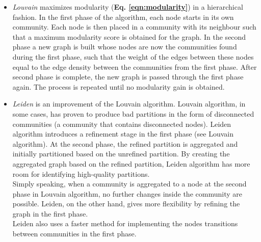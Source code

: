 \begin{itemize}
\item \textit{Louvain}\cite{Blondel_2008} maximizes modularity (\textbf{Eq. \eqref{eqn:modularity}}) in a hierarchical fashion. In the first phase of the algorithm, each node starts in its own community. Each node is then placed in a community with its neighbour such that a maximum modularity score is obtained for the graph. In the second phase a new graph is built whose nodes are now the communities found during the first phase, such that the weight of the edges between these nodes equal to the edge density between the communities from the first phase. After second phase is complete, the new graph is passed through the first phase again. The process is repeated until no modularity gain is obtained.

\item \textit{Leiden}\cite{Traag_2019} is an improvement of the Louvain algorithm. Louvain algorithm, in some cases, has proven to produce bad partitions in the form of disconnected communities (a community that contains disconnected nodes). Leiden algorithm introduces a refinement stage in the first phase (see Louvain algorithm). At the second phase, the refined partition is aggregated and initially partitioned based on the unrefined partition. By creating the aggregated graph based on the refined partition, Leiden algorithm has more room for identifying high-quality partitions.\\
Simply speaking, when a community is aggregated to a node at the second phase in Louvain algorithm, no further changes inside the community are possible. Leiden, on the other hand, gives more flexibility by refining the graph in the first phase.\\
Leiden also uses a faster method for implementing the nodes transitions between communities in the first phase.



\end{itemize}

